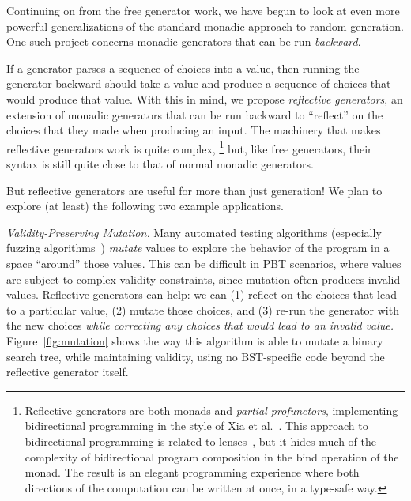 Continuing on from the free generator work, we have begun to look at even more
powerful generalizations of the standard monadic approach to random generation.
One such project concerns monadic generators that can be run {\em backward}.

If a generator parses a sequence of choices into a value, then running the
generator backward should take a value and produce a sequence of choices that
would produce that value. With this in mind, we propose {\em reflective
generators}, an extension of monadic generators that can be run backward to
``reflect'' on the choices that they made when producing an input. The machinery
that makes reflective generators work is quite complex,%
\footnote{Reflective generators are both monads and {\em
    partial profunctors},
implementing bidirectional programming in the style of Xia et
al.~\cite{xia2019composing}. This approach to bidirectional programming is
related to lenses~\cite{foster2009bidirectional}, but it hides much of the
complexity of bidirectional program composition in the bind operation of the
monad. The result is an elegant programming experience where both directions of
the computation can be written at once, in a type-safe way.}
but, like free generators, their syntax is still quite close to that of normal
monadic generators.

But reflective generators are useful for more than just generation!
We plan to explore (at least) the following two example applications.

{\em Validity-Preserving Mutation.}
Many automated testing algorithms
(especially fuzzing algorithms~\cite{afl-readme}) {\em mutate} values to explore
the behavior of the program in a space ``around'' those values. This can be
difficult in PBT scenarios, where values are subject to complex validity
constraints, since mutation often produces invalid values. Reflective
generators can help: we can (1) reflect on the choices that lead to a particular
value, (2) mutate those choices, and (3) re-run the generator with the new
choices {\em while correcting any choices that
would lead to an invalid value.} Figure~\ref{fig:mutation} shows the way this
algorithm is able to mutate a binary search tree, while maintaining validity,
using no BST-specific code beyond the reflective generator itself.

